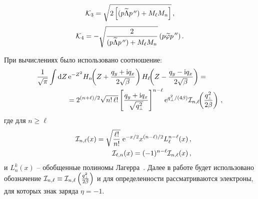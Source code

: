 \begin{equation}
	\label{eq:K3}
	{\cal K}_{3} = \sqrt{2\left [(p\widetilde \Lambda p^{\, \prime \prime}) + 
		M_\ell M_{n} \right]} \, ,  
\end{equation}
%
\begin{equation}
	\label{eq:K4}
	{\cal K}_4 = 
	- \sqrt{\frac{2}{(p\widetilde \Lambda p^{\, \prime \prime}) + M_\ell M_{n}}}\, 
	(p\widetilde \varphi p^{\, \prime \prime}) \, .
\end{equation}

При вычислениях было использовано соотношение:
%
\begin{equation}
	\label{eq:Ilnnl}
	\begin{aligned}
		\frac{1}{\sqrt{\pi}}\int \mathrm{d} Z& \, \mathrm{e}^{-Z^2}  
		H_n \!\! \left (Z + \frac{q_y + \mathrm{i} q_x}{2\sqrt{\beta}} \right )   
		H_{\ell} \!\! \left (Z - \frac{q_y - \mathrm{i} q_x}{2\sqrt{\beta}} \right ) =
		\\
		\nonumber
		&= 2^{(n+\ell)/2} \sqrt{n ! \, \ell !} 
		\left [\frac{q_y + \mathrm{i} q_x}{\sqrt{q^2_{\mbox{\tiny $\bot$}}}} \right ]^{n-\ell} 
		\mathrm{e}^{{q^2_{\mbox{\tiny $\bot$}}}/{(4\beta)}} 
		{\cal I}_{n, \ell} \!\! \left (\frac{q^{2}_{\mbox{\tiny $\bot$}}}{2 \beta} \right ) \, , 
	\end{aligned}
\end{equation}
\noindent где для $n \geqslant \ell$
%
\begin{eqnarray}
	\nonumber
	&&{\cal I}_{n, \ell} (x) = \sqrt{\frac{\ell !}{n !}} \; \mathrm{e}^{-x/2} x^{(n-\ell)/2} L_\ell^{n-\ell} (x) \, ,
	\\
	&&{\cal I}_{\ell, n} (x) = (-1)^{n-\ell} {\cal I}_{n, \ell} (x) \, ,
	\label{eq:Inl}
\end{eqnarray}
\noindent и $L^k_n (x)$ -- обобщенные полиномы Лагерра~\cite{Gradstein:1963}.
Далее в работе будет использовано обозначение ${\cal I}_{n, \ell}\equiv{\cal I}_{n, \ell} \left(\frac{q_\perp^2}{2\beta}\right)$ и для определенности рассматриваются электроны, для которых знак заряда $\eta=-1$.

